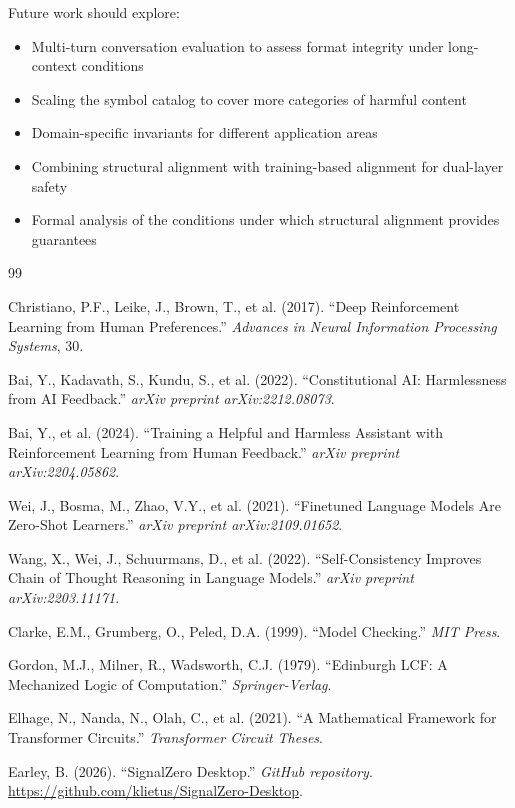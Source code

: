 \documentclass[11pt]{article}
\begin{document}
Future work should explore:
\begin{itemize}[noitemsep,topsep=0pt]
    \item Multi-turn conversation evaluation to assess format integrity under long-context conditions
    \item Scaling the symbol catalog to cover more categories of harmful content
    \item Domain-specific invariants for different application areas
    \item Combining structural alignment with training-based alignment for dual-layer safety
    \item Formal analysis of the conditions under which structural alignment provides guarantees
\end{itemize}


\begin{thebibliography}{99}

Christiano, P.F., Leike, J., Brown, T., et al. (2017).
``Deep Reinforcement Learning from Human Preferences.''
\textit{Advances in Neural Information Processing Systems}, 30.

Bai, Y., Kadavath, S., Kundu, S., et al. (2022).
``Constitutional AI: Harmlessness from AI Feedback.''
\textit{arXiv preprint arXiv:2212.08073}.

Bai, Y., et al. (2024).
``Training a Helpful and Harmless Assistant with Reinforcement Learning from Human Feedback.''
\textit{arXiv preprint arXiv:2204.05862}.

Wei, J., Bosma, M., Zhao, V.Y., et al. (2021).
``Finetuned Language Models Are Zero-Shot Learners.''
\textit{arXiv preprint arXiv:2109.01652}.

Wang, X., Wei, J., Schuurmans, D., et al. (2022).
``Self-Consistency Improves Chain of Thought Reasoning in Language Models.''
\textit{arXiv preprint arXiv:2203.11171}.

Clarke, E.M., Grumberg, O., Peled, D.A. (1999).
``Model Checking.''
\textit{MIT Press}.

Gordon, M.J., Milner, R., Wadsworth, C.J. (1979).
``Edinburgh LCF: A Mechanized Logic of Computation.''
\textit{Springer-Verlag}.

Elhage, N., Nanda, N., Olah, C., et al. (2021).
``A Mathematical Framework for Transformer Circuits.''
\textit{Transformer Circuit Theses}.

Earley, B. (2026).
``SignalZero Desktop.''
\textit{GitHub repository}. \url{https://github.com/klietus/SignalZero-Desktop}.

\end{thebibliography}
\end{document}
